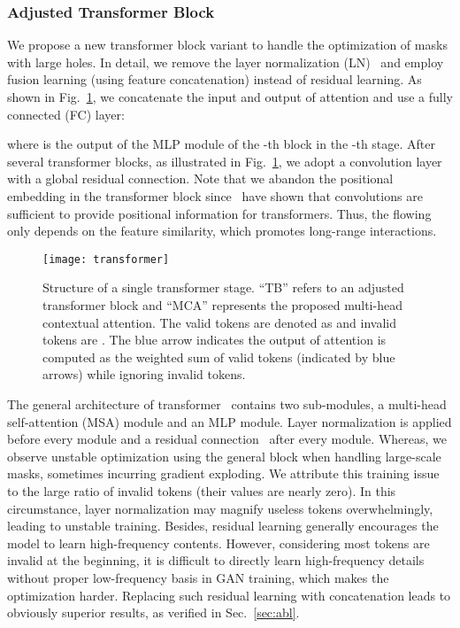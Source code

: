\documentclass[10pt,twocolumn,letterpaper]{article}
\begin{document}
	\subsubsection{Adjusted Transformer Block}
	
	We propose a new transformer block variant to handle the optimization of masks with large holes. In detail, we remove the layer normalization (LN)~\cite{ba2016layer} and employ fusion learning (using feature concatenation) instead of residual learning. As shown in Fig.~\ref{fig:tran}, we concatenate the input and output of attention and use a fully connected (FC) layer:
	
	where  is the output of the MLP module of the -th block in the -th stage. After several transformer blocks, as illustrated in Fig.~\ref{fig:tran}, we adopt a convolution layer with a global residual connection. Note that we abandon the positional embedding in the transformer block since~\cite{xie2021segformer,wu2021cvt} have shown that  convolutions are sufficient to provide positional information for transformers. Thus, the flowing only depends on the feature similarity, which promotes long-range interactions.
	
	\begin{figure}[t]
		\begin{center}
			\texttt{[image: transformer]}
		\end{center}
		\vspace{-0.1in}
		\caption{Structure of a single transformer stage. ``TB'' refers to an adjusted transformer block and ``MCA'' represents the proposed multi-head contextual attention. The valid tokens are denoted as  and invalid tokens are . The blue arrow indicates the output of attention is computed as the weighted sum of valid tokens (indicated by blue arrows) while ignoring invalid tokens.}
		\label{fig:tran}
		\vspace{-0.1in}
	\end{figure}
	
	\vspace{0.08in}
	The general architecture of transformer~\cite{vaswani2017attention} contains two sub-modules, a multi-head self-attention (MSA) module and an MLP module. Layer normalization is applied before every module and a residual connection~\cite{he2016deep} after every module. Whereas, we observe unstable optimization using the general block when handling large-scale masks, sometimes incurring gradient exploding. We attribute this training issue to the large ratio of invalid tokens (their values are nearly zero). In this circumstance, layer normalization may magnify useless tokens overwhelmingly, leading to unstable training. Besides, residual learning generally encourages the model to learn high-frequency contents. However, considering most tokens are invalid at the beginning, it is difficult to directly learn high-frequency details without proper low-frequency basis in GAN training, which makes the optimization harder. Replacing such residual learning with concatenation leads to obviously superior results, as verified in Sec.~\ref{sec:abl}.
\end{document}
